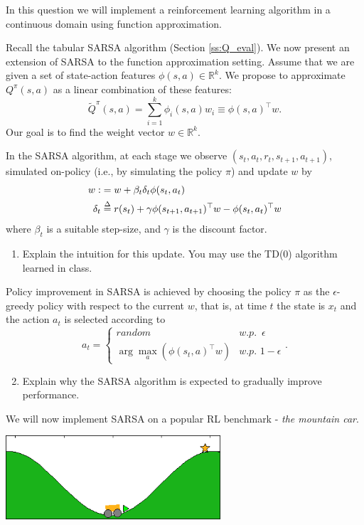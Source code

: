 \begin{exercise}
In this question we will implement a reinforcement learning algorithm in a continuous domain using function approximation.

Recall the tabular SARSA algorithm (Section \ref{ss:Q_eval}). We now present an extension of SARSA to the function approximation setting.
Assume that we are given a set of state-action features $\phi(s,a)\in \mathbb R^k$. We propose to approximate ${Q^\pi }(s,a)$ as a linear combination of these features:
$${\tilde Q^\pi }(s,a) = \mathop \sum \limits_{i = 1}^k {\phi _i}(s,a){w_i} \equiv \phi {(s,a)^ \top }w.$$
Our goal is to find the weight vector  $w \in \mathbb R^k$.

In the SARSA algorithm, at each stage we observe $\left( {{s_t},{a_t},{r_t},{s_{t + 1}},{a_{t + 1}}} \right)$, simulated on-policy (i.e., by simulating the policy $\pi $) and update $w$ by
\begin{align*}
w: &= w + {\beta _t}{\delta _t}\phi ({s_t},{a_t})\\
{\delta _t} &\buildrel \Delta \over = r({s_t}) + \gamma \phi {({s_{t + 1}},{a_{t + 1}})^ \top }w - \phi {({s_t},{a_t})^ \top }w
\end{align*}
where ${\beta _t}$ is a suitable step-size, and $\gamma $ is the discount factor.
\begin{enumerate}
  \item Explain the intuition for this update. You may use the TD(0) algorithm learned in class.
\end{enumerate}

Policy improvement in SARSA is achieved by choosing the policy $\pi $ as the  $\epsilon$-greedy policy with respect to the current $w$, that is, at time $t$ the state is ${x_t}$ and the action ${a_t}$ is selected according to
$${a_t} = \left\{ {\begin{array}{*{20}{c}}
{random}&{w.p.\,\,\,\epsilon}\\
{\arg {{\max }_a}\left( {\phi {{({s_t},a)}^ \top }w} \right)}&{w.p.\,\,1-\epsilon}
\end{array}} \right..$$

\begin{enumerate}
\setcounter{enumi}{1}
  \item Explain why the SARSA algorithm is expected to gradually improve performance.
\end{enumerate}

We will now implement SARSA on a popular RL benchmark - \emph{the mountain car}.
\begin{center}
\includegraphics[width=0.6\textwidth]{hw8_b}
\end{center}


\end{exercise}
